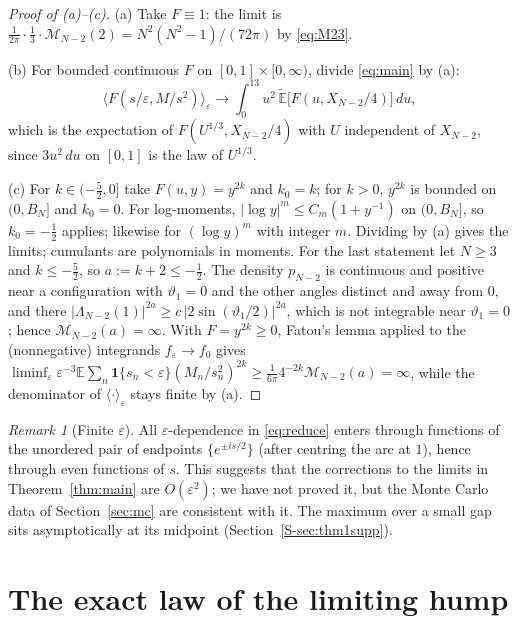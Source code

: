 \documentclass[12pt]{amsart}
\theoremstyle{remark}
\newtheorem{remark}{Remark}
\newcommand{\E}{\mathbb{E}}
\newcommand{\Et}{\widetilde{\mathbb{E}}}
\newcommand{\eps}{\varepsilon}
\newcommand{\1}{\mathbf{1}}
\begin{document}
\begin{proof}[Proof of (a)--(c)]
(a) Take $F\equiv1$: the limit is $\frac1{2\pi}\cdot\frac13\cdot
\mathcal M_{N-2}(2)=N^2(N^2-1)/(72\pi)$ by \eqref{eq:M23}.

(b) For bounded continuous $F$ on $[0,1]\times[0,\infty)$, divide
\eqref{eq:main} by (a):
\[
\langle F(s/\eps,M/s^2)\rangle_\eps\to\int_0^13u^2\,
\Et\big[F(u,X_{N-2}/4)\big]\,du ,
\]
which is the expectation of $F(U^{1/3},X_{N-2}/4)$ with $U$ independent of
$X_{N-2}$, since $3u^2\,du$ on $[0,1]$ is the law of $U^{1/3}$.

(c) For $k\in(-\frac52,0]$ take $F(u,y)=y^{2k}$ and $k_0=k$; for $k>0$,
$y^{2k}$ is bounded on $(0,B_N]$ and $k_0=0$. For log-moments,
$|\log y|^m\le C_m(1+y^{-1})$ on $(0,B_N]$, so $k_0=-\frac12$ applies;
likewise for $(\log y)^m$ with integer $m$. Dividing by (a) gives the
limits; cumulants are polynomials in moments. For the last statement let
$N\ge3$ and $k\le-\frac52$, so $a:=k+2\le-\frac12$. The density $p_{N-2}$ is
continuous and positive near a configuration with $\vartheta_1=0$ and the
other angles distinct and away from $0$, and there
$|\Lambda_{N-2}(1)|^{2a}\ge c\,|2\sin(\vartheta_1/2)|^{2a}$, which is not
integrable near $\vartheta_1=0$; hence $\mathcal M_{N-2}(a)=\infty$. With
$F=y^{2k}\ge0$, Fatou's lemma applied to the (nonnegative) integrands
$f_\eps\to f_0$ gives
$\liminf_\eps\eps^{-3}\E\sum_n\1\{s_n<\eps\}(M_n/s_n^2)^{2k}
\ge\frac1{6\pi}4^{-2k}\mathcal M_{N-2}(a)=\infty$, while the denominator of
$\langle\cdot\rangle_\eps$ stays finite by (a).
\end{proof}

\begin{remark}[Finite $\eps$]\label{rem:finiteeps}
All $\eps$-dependence in \eqref{eq:reduce} enters through functions of the
unordered pair of endpoints $\{e^{\pm is/2}\}$ (after centring the arc at
$1$), hence through even functions of $s$. This suggests that the
corrections to the limits in Theorem~\ref{thm:main} are $O(\eps^2)$; we
have not proved it, but the Monte Carlo data of Section~\ref{sec:mc} are
consistent with it. The maximum over a small gap sits asymptotically at
its midpoint (Section~\ref{S-sec:thm1supp}).
\end{remark}

\section{The exact law of the limiting hump}\label{sec:thm2}
\end{document}
